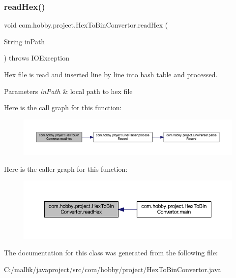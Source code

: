 \subsubsection{\texorpdfstring{read\+Hex()}{readHex()}}
{\footnotesize\ttfamily void com.\+hobby.\+project.\+Hex\+To\+Bin\+Convertor.\+read\+Hex (\begin{DoxyParamCaption}\item[{String}]{in\+Path }\end{DoxyParamCaption}) throws I\+O\+Exception}

Hex file is read and inserted line by line into hash table and processed.


\begin{DoxyParams}{Parameters}
{\em in\+Path} & local path to hex file \\
\hline
\end{DoxyParams}
Here is the call graph for this function\+:
\nopagebreak
\begin{figure}[H]
\begin{center}
\leavevmode
\includegraphics[width=350pt]{classcom_1_1hobby_1_1project_1_1_hex_to_bin_convertor_aa8274cd08e200940cfe99c93292c5aec_cgraph}
\end{center}
\end{figure}
Here is the caller graph for this function\+:
\nopagebreak
\begin{figure}[H]
\begin{center}
\leavevmode
\includegraphics[width=350pt]{classcom_1_1hobby_1_1project_1_1_hex_to_bin_convertor_aa8274cd08e200940cfe99c93292c5aec_icgraph}
\end{center}
\end{figure}


The documentation for this class was generated from the following file\+:\begin{DoxyCompactItemize}
\item 
C\+:/mallik/javaproject/src/com/hobby/project/Hex\+To\+Bin\+Convertor.\+java\end{DoxyCompactItemize}
